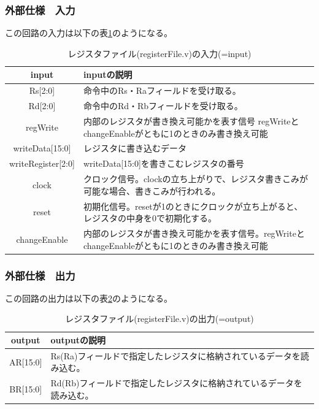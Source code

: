 \documentclass[a4j,titlepage]{jarticle}
\begin{document}
\subsubsection{外部仕様　入力}
この回路の入力は以下の表\ref{registerFileI}のようになる。
\begin{table}[H]
    \caption{レジスタファイル(registerFile.v)の入力(=input)}
    \label{registerFileI}
    \begin{center}
    \begin {tabularx}{150mm}{|c|X|} \hline
         input & inputの説明 \\ \hline \hline
         Rs[2:0] & 命令中のRs・Raフィールドを受け取る。\\ \hline
         Rd[2:0] & 命令中のRd・Rbフィールドを受け取る。\\ \hline
         regWrite & 内部のレジスタが書き換え可能かを表す信号 regWriteとchangeEnableがともに1のときのみ書き換え可能\\ \hline
         writeData[15:0] & レジスタに書き込むデータ\\ \hline
         writeRegister[2:0] & writeData[15:0]を書きこむレジスタの番号\\ \hline
         clock & クロック信号。clockの立ち上がりで、レジスタ書きこみが可能な場合、書きこみが行われる。\\ \hline
         reset & 初期化信号。resetが1のときにクロックが立ち上がると、レジスタの中身を0で初期化する。\\ \hline
         changeEnable & 内部のレジスタが書き換え可能かを表す信号。regWriteとchangeEnableがともに1のときのみ書き換え可能\\ \hline
    \end{tabularx}
    \end{center}
\end{table}

\subsubsection{外部仕様　出力}
この回路の出力は以下の表\ref{registerFileO}のようになる。
\begin{table}[H]
    \caption{レジスタファイル(registerFile.v)の出力(=output)}
    \label{registerFileO}
    \begin{center}
    \begin {tabularx}{150mm}{|c|X|} \hline
         output & outputの説明 \\ \hline \hline
         AR[15:0] & Rs(Ra)フィールドで指定したレジスタに格納されているデータを読み込む。 \\ \hline
         BR[15:0] & Rd(Rb)フィールドで指定したレジスタに格納されているデータを読み込む。 \\ \hline
    \end {tabularx}
    \end{center}
\end{table}
\end{document}
